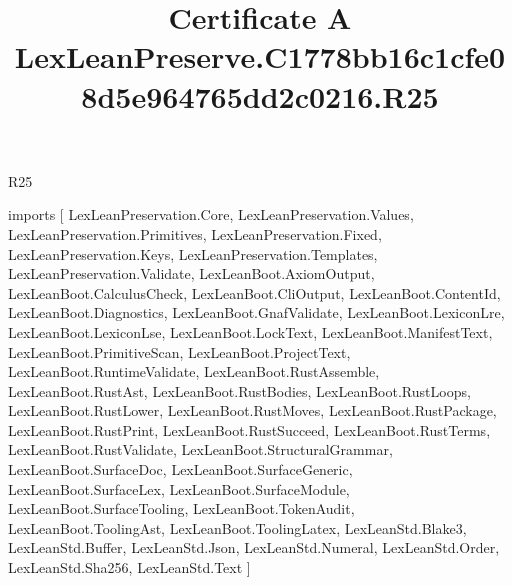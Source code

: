 \begin{lexlean}{R25}
\title{Certificate A LexLeanPreserve.C1778bb16c1cfe08d5e964765dd2c0216.R25}
\begin{coremodule}
imports [
  LexLeanPreservation.Core,
  LexLeanPreservation.Values,
  LexLeanPreservation.Primitives,
  LexLeanPreservation.Fixed,
  LexLeanPreservation.Keys,
  LexLeanPreservation.Templates,
  LexLeanPreservation.Validate,
  LexLeanBoot.AxiomOutput,
  LexLeanBoot.CalculusCheck,
  LexLeanBoot.CliOutput,
  LexLeanBoot.ContentId,
  LexLeanBoot.Diagnostics,
  LexLeanBoot.GnafValidate,
  LexLeanBoot.LexiconLre,
  LexLeanBoot.LexiconLse,
  LexLeanBoot.LockText,
  LexLeanBoot.ManifestText,
  LexLeanBoot.PrimitiveScan,
  LexLeanBoot.ProjectText,
  LexLeanBoot.RuntimeValidate,
  LexLeanBoot.RustAssemble,
  LexLeanBoot.RustAst,
  LexLeanBoot.RustBodies,
  LexLeanBoot.RustLoops,
  LexLeanBoot.RustLower,
  LexLeanBoot.RustMoves,
  LexLeanBoot.RustPackage,
  LexLeanBoot.RustPrint,
  LexLeanBoot.RustSucceed,
  LexLeanBoot.RustTerms,
  LexLeanBoot.RustValidate,
  LexLeanBoot.StructuralGrammar,
  LexLeanBoot.SurfaceDoc,
  LexLeanBoot.SurfaceGeneric,
  LexLeanBoot.SurfaceLex,
  LexLeanBoot.SurfaceModule,
  LexLeanBoot.SurfaceTooling,
  LexLeanBoot.TokenAudit,
  LexLeanBoot.ToolingAst,
  LexLeanBoot.ToolingLatex,
  LexLeanStd.Blake3,
  LexLeanStd.Buffer,
  LexLeanStd.Json,
  LexLeanStd.Numeral,
  LexLeanStd.Order,
  LexLeanStd.Sha256,
  LexLeanStd.Text
]


\end{coremodule}
\end{lexlean}
